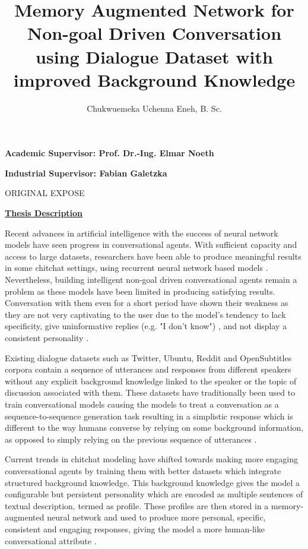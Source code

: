 \documentclass{article}
\title{Memory Augmented Network for Non-goal Driven Conversation using Dialogue Dataset with improved Background Knowledge}
\author{Chukwuemeka Uchenna Eneh, B. Sc.}
\begin{document}
	\maketitle
	
	
	\textbf{Academic Supervisor: Prof. Dr.-Ing. Elmar Noeth}
	
	\textbf{Industrial Supervisor: Fabian Galetzka}
	
	ORIGINAL EXPOSE
	
	\underline{\textbf{Thesis Description}}
	
	Recent advances in artificial intelligence with the success of neural network models have seen progress in conversational agents. With sufficient capacity and access to large datasets, researchers have been able to produce meaningful results in some chitchat settings, using recurrent neural network based models \cite{vinyals2015neural}. Nevertheless, building intelligent non-goal driven conversational agents remain a problem as these models have been limited in producing satisfying results. Conversation with them even for a short period have shown their weakness as they are not very captivating to the user due to the model's tendency to lack specificity, give uninformative replies (e.g. "I don't know") \cite{li2015diversity}, and not display a consistent personality \cite{serban2016generative, vinyals2015neural}.
		
	Existing dialogue datasets such as Twitter, Ubuntu, Reddit and OpenSubtitles corpora \cite{serban2015survey} contain a sequence of utterances and responses from different speakers without any explicit background knowledge linked to the speaker or the topic of discussion associated with them. These datasets have traditionally been used to train conversational models causing the models to treat a conversation as a sequence-to-sequence generation task resulting in a simplistic response \cite{li2015diversity} which is different to the way humans converse by relying on some background information, as opposed to simply relying on the previous sequence of utterances \cite{moghe2018towards}. 
	
	Current trends in chitchat modeling have shifted towards making more engaging conversational agents by training them with better datasets which integrate structured background knowledge. This background knowledge gives the model a configurable but persistent personality which are encoded as multiple sentences of textual description, termed as profile. These profiles are then stored in a memory-augmented neural network and used to produce more personal, specific, consistent and engaging responses, giving the model a more human-like conversational attribute \cite{zhang2018personalizing}.
	
\end{document}
